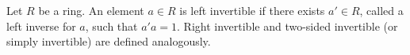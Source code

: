 Let $R$ be a ring. An element $a \in R$ is left invertible if there exists $a' \in R$, called a left inverse for $a$, such that $a'a = 1$. Right invertible and two-sided invertible (or simply invertible) are defined analogously.

